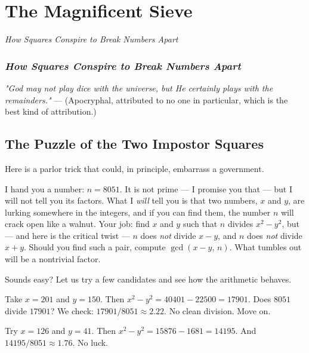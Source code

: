 \chapter{The Magnificent Sieve}

\begin{center}\textit{How Squares Conspire to Break Numbers Apart}\end{center}
\bigskip

\subsection*{\textit{How Squares Conspire to Break Numbers Apart}}

\bigskip


\begin{displayquote}
\textit{"God may not play dice with the universe, but He certainly plays with the remainders."}
--- (Apocryphal, attributed to no one in particular, which is the best kind of attribution.)
\end{displayquote}


\bigskip

\section*{The Puzzle of the Two Impostor Squares}

Here is a parlor trick that could, in principle, embarrass a government.

I hand you a number: $n = 8051$. It is not prime --- I promise you that --- but I will not tell you its factors. What I \textit{will} tell you is that two numbers, $x$ and $y$, are lurking somewhere in the integers, and if you can find them, the number $n$ will crack open like a walnut. Your job: find $x$ and $y$ such that $n$ divides $x^2 - y^2$, but --- and here is the critical twist --- $n$ does \textit{not} divide $x - y$, and $n$ does \textit{not} divide $x + y$. Should you find such a pair, compute $\gcd(x - y, \, n)$. What tumbles out will be a nontrivial factor.

Sounds easy? Let us try a few candidates and see how the arithmetic behaves.

Take $x = 201$ and $y = 150$. Then $x^2 - y^2 = 40401 - 22500 = 17901$. Does $8051$ divide $17901$? We check: $17901 / 8051 \approx 2.22$. No clean division. Move on.

Try $x = 126$ and $y = 41$. Then $x^2 - y^2 = 15876 - 1681 = 14195$. And $14195 / 8051 \approx 1.76$. No luck.

